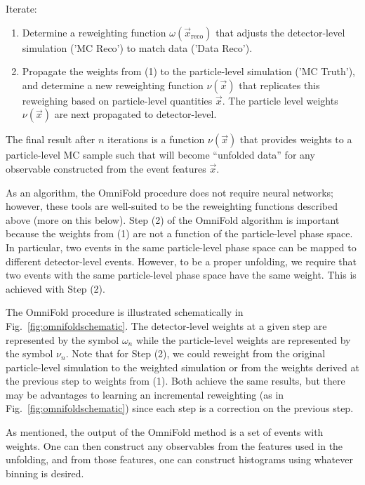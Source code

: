 \begin{description}
\item Iterate:
  \begin{enumerate}[label={(\arabic*)}]
    \item Determine a reweighting function $\omega(\vec{x}_\mathrm{reco})$ that adjusts the detector-level simulation ('MC Reco') to match data ('Data Reco').
    \item Propagate the weights from (1) to the particle-level simulation ('MC Truth'), and determine a new reweighting function $\nu(\vec{x})$ that replicates this reweighing based on particle-level quantities $\vec{x}$. The particle level weights $\nu(\vec{x})$ are next propagated to detector-level.
 \end{enumerate}
\end{description}
%
The final result after $n$ iterations is a function $\nu(\vec{x})$ that provides weights to a particle-level MC sample such that will become ``unfolded data'' for any observable constructed from the event features $\vec{x}$. 

As an algorithm, the OmniFold procedure does not require neural networks; however, these tools are well-suited to be the reweighting functions described above (more on this below).  Step (2) of the OmniFold algorithm is important because the weights from (1) are not a function of the particle-level phase space.  In particular, two events in the same particle-level phase space can be mapped to different detector-level events.  However, to be a proper unfolding, we require that two events with the same particle-level phase space have the same weight.  This is achieved with Step (2).

The OmniFold procedure is illustrated schematically in Fig.~\ref{fig:omnifoldschematic}.  The detector-level weights at a given step are represented by the symbol $\omega_n$ while the particle-level weights are represented by the symbol $\nu_n$.  Note that for Step (2), we could reweight from the original particle-level simulation to the weighted simulation or from the weights derived at the previous step to weights from (1).  Both achieve the same results, but there may be advantages to learning an incremental reweighting (as in Fig.~\ref{fig:omnifoldschematic}) since each step is a correction on the previous step.

As mentioned, the output of the OmniFold method is a set of events with weights.  One can then construct any observables from the features used in the unfolding, and from those features, one can construct histograms using whatever binning is desired.

